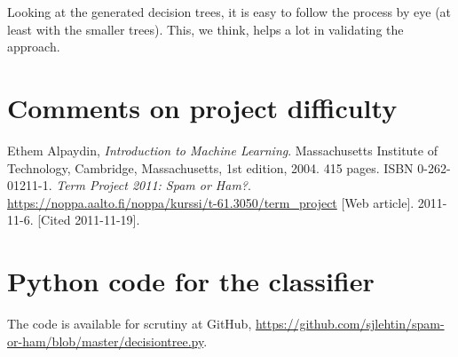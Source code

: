 \documentclass[a4paper,10pt]{article}
\begin{document}
Looking at the generated decision trees, it is easy to follow the
process by eye (at least with the smaller trees).  This, we think, helps
a lot in validating the approach.

\section{Comments on project difficulty}

\afterpage{\clearpage} %
\pagebreak
\begin{thebibliography}{9}
  Ethem Alpaydin,
  \emph{Introduction to Machine Learning}.
  Massachusetts Institute of Technology, Cambridge, Massachusetts,
  1st edition,
  2004. 415 pages. ISBN 0-262-01211-1.
  \emph{Term Project 2011: Spam or Ham?}.
  \href{https://noppa.aalto.fi/noppa/kurssi/t-61.3050/term\_project}
  {https://noppa.aalto.fi/noppa/kurssi/t-61.3050/term\_project}
  [Web article]. 2011-11-6. [Cited 2011-11-19].

\end{thebibliography}

\appendix
\section{Python code for the classifier}

The code is available for scrutiny at GitHub,
\href{https://github.com/sjlehtin/spam-or-ham/blob/master/decisiontree.py}
{https://github.com/sjlehtin/spam-or-ham/blob/master/decisiontree.py}.

% 
%
\end{document}
